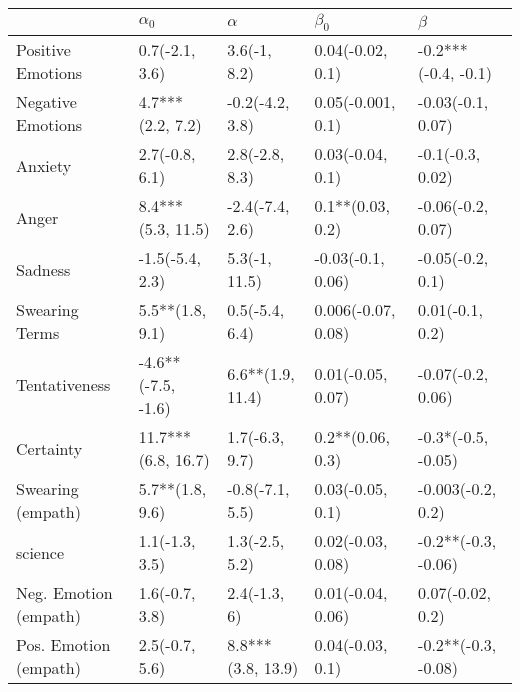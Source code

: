 \begin{tabular}{lllll}
\toprule
{} &          $\alpha_0$ &           $\alpha$ &           $\beta_0$ &              $\beta$ \\
\midrule
Positive Emotions     &      0.7(-2.1, 3.6) &       3.6(-1, 8.2) &    0.04(-0.02, 0.1) &  -0.2***(-0.4, -0.1) \\
Negative Emotions     &    4.7***(2.2, 7.2) &    -0.2(-4.2, 3.8) &   0.05(-0.001, 0.1) &    -0.03(-0.1, 0.07) \\
Anxiety               &      2.7(-0.8, 6.1) &     2.8(-2.8, 8.3) &    0.03(-0.04, 0.1) &     -0.1(-0.3, 0.02) \\
Anger                 &   8.4***(5.3, 11.5) &    -2.4(-7.4, 2.6) &    0.1**(0.03, 0.2) &    -0.06(-0.2, 0.07) \\
Sadness               &     -1.5(-5.4, 2.3) &      5.3(-1, 11.5) &   -0.03(-0.1, 0.06) &     -0.05(-0.2, 0.1) \\
Swearing Terms        &     5.5**(1.8, 9.1) &     0.5(-5.4, 6.4) &  0.006(-0.07, 0.08) &      0.01(-0.1, 0.2) \\
Tentativeness         &  -4.6**(-7.5, -1.6) &   6.6**(1.9, 11.4) &   0.01(-0.05, 0.07) &    -0.07(-0.2, 0.06) \\
Certainty             &  11.7***(6.8, 16.7) &     1.7(-6.3, 9.7) &    0.2**(0.06, 0.3) &   -0.3*(-0.5, -0.05) \\
Swearing (empath)     &     5.7**(1.8, 9.6) &    -0.8(-7.1, 5.5) &    0.03(-0.05, 0.1) &    -0.003(-0.2, 0.2) \\
science               &      1.1(-1.3, 3.5) &     1.3(-2.5, 5.2) &   0.02(-0.03, 0.08) &  -0.2**(-0.3, -0.06) \\
Neg. Emotion (empath) &      1.6(-0.7, 3.8) &       2.4(-1.3, 6) &   0.01(-0.04, 0.06) &     0.07(-0.02, 0.2) \\
Pos. Emotion (empath) &      2.5(-0.7, 5.6) &  8.8***(3.8, 13.9) &    0.04(-0.03, 0.1) &  -0.2**(-0.3, -0.08) \\
\bottomrule
\end{tabular}

